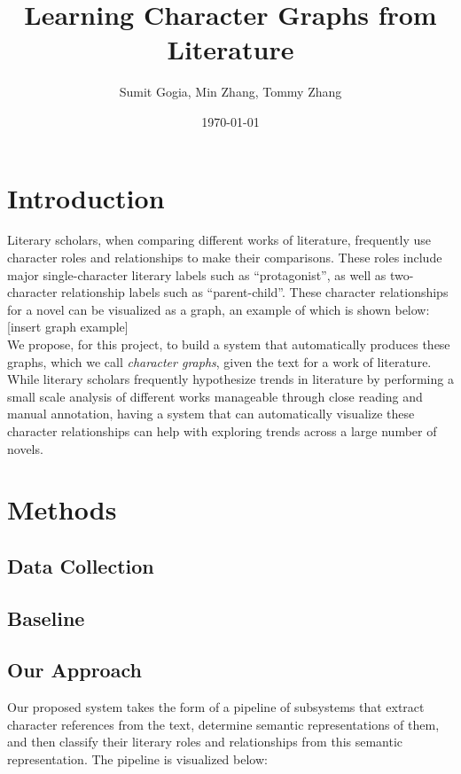\documentclass[dvips,12pt]{article}
\begin{document}
\title{Learning Character Graphs from Literature}
\author{Sumit Gogia, Min Zhang, Tommy Zhang}
\date{\today}

\maketitle

\section{Introduction}
    Literary scholars, when comparing different works of literature, frequently use character roles and relationships to make their comparisons. These roles include major single-character literary labels such as ``protagonist'', as well as two-character relationship labels such as ``parent-child''. These character relationships for a novel can be visualized as a graph, an example of which is shown below: \\

    [insert graph example] \\

    We propose, for this project, to build a system that automatically produces these graphs, which we call \emph{character graphs}, given the text for a work of literature. While literary scholars frequently hypothesize trends in literature by performing a small scale analysis of different works manageable through close reading and manual annotation, having a system that can automatically visualize these character relationships can help with exploring trends across a large number of novels.

\section{Methods}
\subsection{Data Collection}
\subsection{Baseline}
\subsection{Our Approach}
    Our proposed system takes the form of a pipeline of subsystems that extract character references from the text, determine semantic representations of them, and then classify their literary roles and relationships from this semantic representation. The pipeline is visualized below: \\
    
\end{document}
